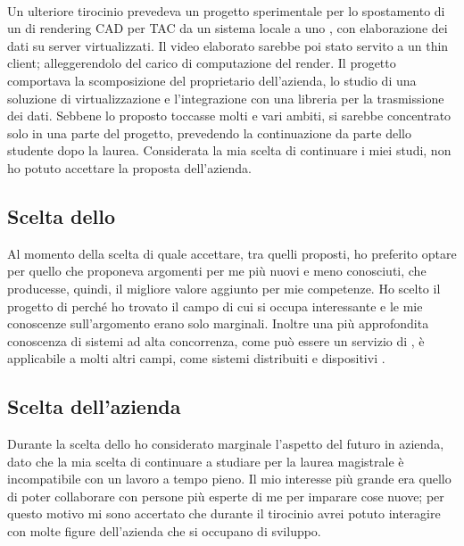    \paragraph*{}
   Un ulteriore tirocinio prevedeva un progetto sperimentale per lo spostamento di un  di rendering \gls{CAD} per \gls{TAC} da un sistema locale a uno , con elaborazione dei dati su server virtualizzati. Il video elaborato sarebbe poi stato servito a un \gls{thin client}; alleggerendolo del carico di computazione del render. Il progetto comportava la scomposizione del  proprietario dell'azienda, lo studio di una soluzione di virtualizzazione e l'integrazione con una libreria per la trasmissione dei dati. Sebbene lo  proposto toccasse molti e vari ambiti, si sarebbe concentrato solo in una parte del progetto, prevedendo la continuazione da parte dello studente dopo la laurea. Considerata la mia scelta di continuare i miei studi, non ho potuto accettare la proposta dell'azienda.

   \subsection{Scelta dello }
   Al momento della scelta di quale  accettare, tra quelli proposti, ho preferito optare per quello che proponeva argomenti per me più nuovi e meno conosciuti, che producesse, quindi, il migliore valore aggiunto per mie competenze.
   Ho scelto il progetto di \nomeAzienda{} perché ho trovato il campo di cui si occupa interessante e le mie conoscenze sull'argomento erano solo marginali. Inoltre una più approfondita conoscenza di sistemi ad alta concorrenza, come può essere un servizio di , è applicabile a molti altri campi, come sistemi  distribuiti e dispositivi .

   \subsection{Scelta dell'azienda}
   Durante la scelta dello  ho considerato marginale l'aspetto del futuro in azienda, dato che la mia scelta di continuare a studiare per la laurea magistrale è incompatibile con un lavoro a tempo pieno. Il mio interesse più grande era quello di poter collaborare con persone più esperte di me per imparare cose nuove; per questo motivo mi sono accertato che durante il tirocinio avrei potuto interagire con molte figure dell'azienda che si occupano di sviluppo.
